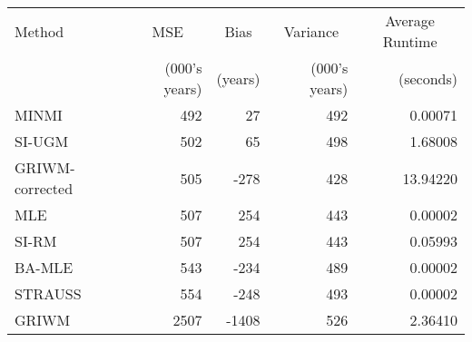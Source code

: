
\begin{tabular}{lrrrr}
\toprule
\multicolumn{1}{l}{Method} & \multicolumn{1}{c}{MSE} & \multicolumn{1}{c}{Bias} & \multicolumn{1}{c}{Variance} & \multicolumn{1}{c}{Average Runtime} \\
 & (000's years) & (years) & (000's years) & (seconds)\\
\midrule
MINMI & 492 & 27 & 492 & 0.00071\\
SI-UGM & 502 & 65 & 498 & 1.68008\\
GRIWM-corrected & 505 & -278 & 428 & 13.94220\\
MLE & 507 & 254 & 443 & 0.00002\\
SI-RM & 507 & 254 & 443 & 0.05993\\
\addlinespace
BA-MLE & 543 & -234 & 489 & 0.00002\\
STRAUSS & 554 & -248 & 493 & 0.00002\\
GRIWM & 2507 & -1408 & 526 & 2.36410\\
\bottomrule
\end{tabular}
